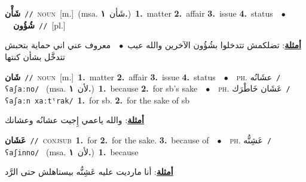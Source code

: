 \documentclass[10pt,a4paper,twoside]{article} %
\begin{document}
\begin{multicols}{2}
{{{\setlength\topsep{0pt}\textbf{\foreignlanguage{arabic}{شَأْن}}\ {\color{gray}\texttt{//}\color{black}}\ \textsc{noun}\ [m.]\ \color{gray}(msa. \foreignlanguage{arabic}{شَأن}~\foreignlanguage{arabic}{\textbf{١.}})\color{black}\ \textbf{1.}~matter  \textbf{2.}~affair  \textbf{3.}~issue  \textbf{4.}~status\ \ $\bullet$\ \ \setlength\topsep{0pt}\textbf{\foreignlanguage{arabic}{شُؤُون}}\ {\color{gray}\texttt{//}\color{black}}\ [pl.]\  \begin{flushright}\color{gray}\foreignlanguage{arabic}{\textbf{\underline{\foreignlanguage{arabic}{أمثلة}}}: تضلكمش تتدخلوا بشُؤُون الآخرين والله عيب\ $\bullet$\ \  معروف عني اني حماية بتحبش تتدخَّل بشأن كنتها}\end{flushright}\color{black}} \vspace{2mm}

{\setlength\topsep{0pt}\textbf{\foreignlanguage{arabic}{شَان}}\ {\color{gray}\texttt{//}\color{black}}\ \textsc{noun}\ [m.]\ \textbf{1.}~matter  \textbf{2.}~affair  \textbf{3.}~issue  \textbf{4.}~status\ \ $\bullet$\ \ \textsc{ph.} \color{gray} \foreignlanguage{arabic}{عشَانُه}\color{black}\ {\color{gray}\texttt{/{\sffamily ʕaʃaːno}/}\color{black}}\ \color{gray} (msa. \foreignlanguage{arabic}{لأن}~\foreignlanguage{arabic}{\textbf{١.}})\color{black}\ \textbf{1.}~because  \textbf{2.}~for sb's sake\ \ $\bullet$\ \ \textsc{ph.} \color{gray} \foreignlanguage{arabic}{عَشَان خَاطْرَك}\color{black}\ {\color{gray}\texttt{/{\sffamily ʕaʃaːn xaːtˤrak}/}\color{black}}\ \textbf{1.}~for sb.  \textbf{2.}~for the sake of sb\  \begin{flushright}\color{gray}\foreignlanguage{arabic}{\textbf{\underline{\foreignlanguage{arabic}{أمثلة}}}: والله ياعمي إِجيت عشانُه وعشانك}\end{flushright}\color{black}} \vspace{2mm}

{\setlength\topsep{0pt}\textbf{\foreignlanguage{arabic}{عَشَان}}\ {\color{gray}\texttt{//}\color{black}}\ \textsc{conj\textunderscore sub}\ \textbf{1.}~for  \textbf{2.}~for the sake.  \textbf{3.}~because of\ \ $\bullet$\ \ \textsc{ph.} \color{gray} \foreignlanguage{arabic}{عَشِنُّه}\color{black}\ {\color{gray}\texttt{/{\sffamily ʕaʃinno}/}\color{black}}\ \color{gray} (msa. \foreignlanguage{arabic}{لأن}~\foreignlanguage{arabic}{\textbf{١.}})\color{black}\ \textbf{1.}~because\  \begin{flushright}\color{gray}\foreignlanguage{arabic}{\textbf{\underline{\foreignlanguage{arabic}{أمثلة}}}: أنا مارديت عليه عَشِنُّه بيستاهلش حتى الرَّد}\end{flushright}\color{black}} \vspace{2mm}

}}
\end{multicols}
\end{document}
